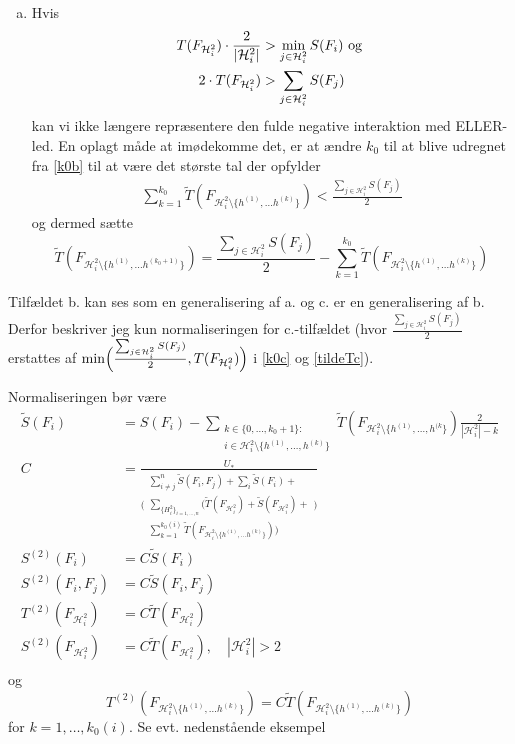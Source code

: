 \documentclass[a4paper, 12pt]{memoir}
\begin{document}
\begin{enumerate}[(i)]
\begin{enumerate}[a.]
\item
Hvis 
\begin{gather}
T(F_{\mathcal H_i^2})\cdot \frac{2}{|\mathcal H_i^2|}>\min_{j\in \mathcal H_i^2}S(F_i) \textup{ og }\\ 
2\cdot T(F_{\mathcal H_i^2})>\sum_{j\in \mathcal H_i^2}S(F_j)\label{total_negative_interaction_limit}
\end{gather}
kan vi ikke længere repræsentere den fulde negative interaktion med ELLER-led. En oplagt måde at imødekomme det, er at ændre $k_0$ til at blive udregnet fra \eqref{k0b} til at være det største tal der opfylder
\begin{align}
\sum_{k=1}^{k_0}\tilde T(F_{\mathcal H_i^2\setminus \{h^{(1)}, \dots h^{(k)}\}})< \frac{\sum_{j\in \mathcal H_i^2} S(F_j)}{2}\label{k0c}
\end{align}
og dermed sætte 
\begin{equation}
\tilde T(F_{\mathcal H_i^2\setminus \{h^{(1)}, \dots h^{(k_0+1)}\}})=\frac{\sum_{j\in \mathcal H_i^2} S(F_j)}{2}-\sum_{k=1}^{k_0}\tilde T(F_{\mathcal H_i^2\setminus \{h^{(1)}, \dots h^{(k)}\}})\label{tildeTc}
\end{equation}
\end{enumerate}
Tilfældet b. kan ses som en generalisering af a. og c. er en generalisering af b. Derfor beskriver jeg kun normaliseringen for c.-tilfældet (hvor $\frac{\sum_{j\in \mathcal H_i^2} S(F_j)}{2}$ erstattes af $\min\Bigl(\frac{\sum_{j\in \mathcal H_i^2} S(F_j)}{2}, T(F_{\mathcal H_i^2})\Bigr)$ i \eqref{k0c} og \eqref{tildeTc}). 

Normaliseringen bør være
\begin{align}
\tilde S(F_i)&=S(F_i)-
\sum_{\substack{k\in \{0, \dots, k_0+1\}:\\ i\in \mathcal H_i^2\setminus \{h^{(1)}, \dots, h^{(k)}\}}} 
\tilde T(F_{\mathcal H_i^2\setminus \{h^{(1)}, \dots, h^{(k}\}})\frac{2}{|\mathcal H_i^2|-k}\\
C&=\frac{U_*}{\Biggl(\substack{\sum_{i\neq j}^n \tilde S(F_i,F_j)+\sum_i \tilde S(F_i)+\\\sum_{\{H_i^2\}_{i=1, \dots, n}}\bigl(\tilde T(F_{\mathcal H_i^2})+\tilde S(F_{\mathcal H_i^2})+\\\sum_{k=1}^{k_0(i)} \tilde T(F_{\mathcal H_i^2\setminus \{h^{(1)}, \dots h^{(k)}\}})\bigr)}\Biggr)}\\
S^{(2)}(F_i)&=C\tilde S(F_i)\\
S^{(2)}(F_i,F_j)&=C\tilde S(F_i,F_j)\\
T^{(2)}(F_{\mathcal H_i^2})&=C\tilde T(F_{\mathcal H_i^2})\\
S^{(2)}(F_{\mathcal H_i^2})&=C\tilde T(F_{\mathcal H_i^2}), \quad |\mathcal H_i^2|>2\\
\end{align}
og
\begin{equation}
T^{(2)}(F_{\mathcal H_i^2\setminus \{h^{(1)}, \dots h^{(k)}\}})=C\tilde T(F_{\mathcal H_i^2\setminus \{h^{(1)}, \dots h^{(k)}\}}) 
\end{equation}
for $k=1, \dots, k_0(i)$. Se evt. nedenstående eksempel
\end{enumerate}
\end{document}
